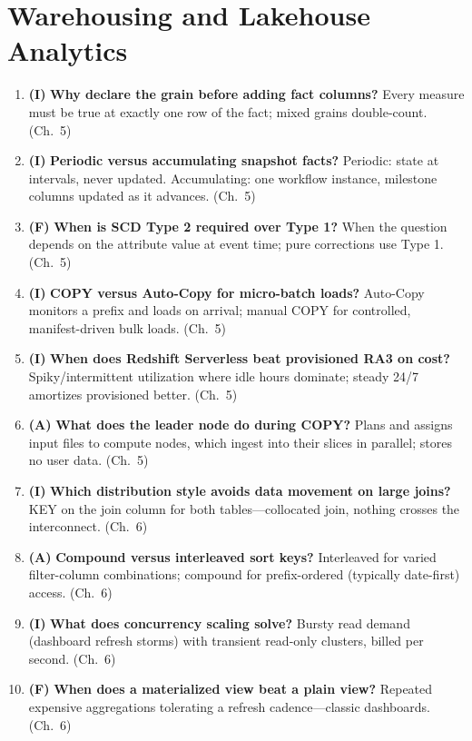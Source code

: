 \section{Warehousing and Lakehouse Analytics}
\begin{enumerate}
    \item \textbf{(I)} \textbf{Why declare the grain before adding fact columns?}
    Every measure must be true at exactly one row of the fact; mixed grains double-count. (Ch.~5)
    \item \textbf{(I)} \textbf{Periodic versus accumulating snapshot facts?}
    Periodic: state at intervals, never updated. Accumulating: one workflow instance, milestone
    columns updated as it advances. (Ch.~5)
    \item \textbf{(F)} \textbf{When is SCD Type 2 required over Type 1?}
    When the question depends on the attribute value at event time; pure corrections use Type 1.
    (Ch.~5)
    \item \textbf{(I)} \textbf{COPY versus Auto-Copy for micro-batch loads?}
    Auto-Copy monitors a prefix and loads on arrival; manual COPY for controlled, manifest-driven
    bulk loads. (Ch.~5)
    \item \textbf{(I)} \textbf{When does Redshift Serverless beat provisioned RA3 on cost?}
    Spiky/intermittent utilization where idle hours dominate; steady 24/7 amortizes provisioned
    better. (Ch.~5)
    \item \textbf{(A)} \textbf{What does the leader node do during COPY?}
    Plans and assigns input files to compute nodes, which ingest into their slices in parallel;
    stores no user data. (Ch.~5)
    \item \textbf{(I)} \textbf{Which distribution style avoids data movement on large joins?}
    KEY on the join column for both tables---collocated join, nothing crosses the interconnect.
    (Ch.~6)
    \item \textbf{(A)} \textbf{Compound versus interleaved sort keys?}
    Interleaved for varied filter-column combinations; compound for prefix-ordered (typically
    date-first) access. (Ch.~6)
    \item \textbf{(I)} \textbf{What does concurrency scaling solve?}
    Bursty read demand (dashboard refresh storms) with transient read-only clusters, billed per
    second. (Ch.~6)
    \item \textbf{(F)} \textbf{When does a materialized view beat a plain view?}
    Repeated expensive aggregations tolerating a refresh cadence---classic dashboards. (Ch.~6)

\end{enumerate}
